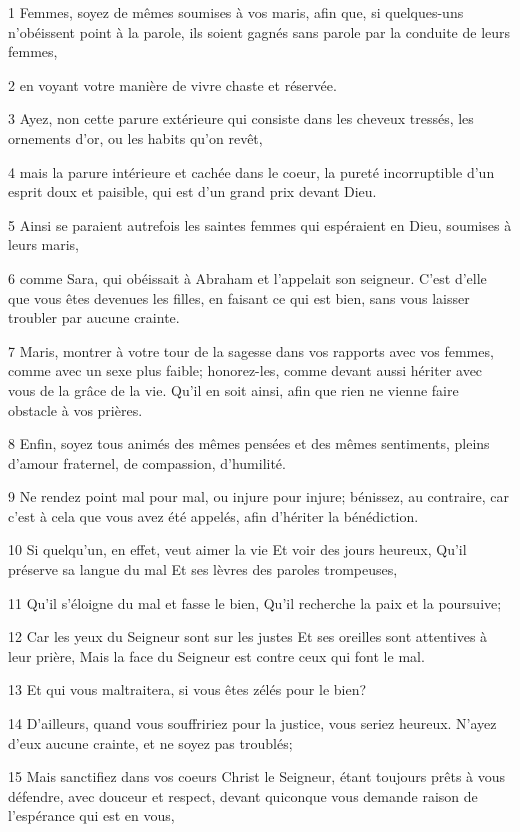 \par 1 Femmes, soyez de mêmes soumises à vos maris, afin que, si quelques-uns n'obéissent point à la parole, ils soient gagnés sans parole par la conduite de leurs femmes,
\par 2 en voyant votre manière de vivre chaste et réservée.
\par 3 Ayez, non cette parure extérieure qui consiste dans les cheveux tressés, les ornements d'or, ou les habits qu'on revêt,
\par 4 mais la parure intérieure et cachée dans le coeur, la pureté incorruptible d'un esprit doux et paisible, qui est d'un grand prix devant Dieu.
\par 5 Ainsi se paraient autrefois les saintes femmes qui espéraient en Dieu, soumises à leurs maris,
\par 6 comme Sara, qui obéissait à Abraham et l'appelait son seigneur. C'est d'elle que vous êtes devenues les filles, en faisant ce qui est bien, sans vous laisser troubler par aucune crainte.
\par 7 Maris, montrer à votre tour de la sagesse dans vos rapports avec vos femmes, comme avec un sexe plus faible; honorez-les, comme devant aussi hériter avec vous de la grâce de la vie. Qu'il en soit ainsi, afin que rien ne vienne faire obstacle à vos prières.
\par 8 Enfin, soyez tous animés des mêmes pensées et des mêmes sentiments, pleins d'amour fraternel, de compassion, d'humilité.
\par 9 Ne rendez point mal pour mal, ou injure pour injure; bénissez, au contraire, car c'est à cela que vous avez été appelés, afin d'hériter la bénédiction.
\par 10 Si quelqu'un, en effet, veut aimer la vie Et voir des jours heureux, Qu'il préserve sa langue du mal Et ses lèvres des paroles trompeuses,
\par 11 Qu'il s'éloigne du mal et fasse le bien, Qu'il recherche la paix et la poursuive;
\par 12 Car les yeux du Seigneur sont sur les justes Et ses oreilles sont attentives à leur prière, Mais la face du Seigneur est contre ceux qui font le mal.
\par 13 Et qui vous maltraitera, si vous êtes zélés pour le bien?
\par 14 D'ailleurs, quand vous souffririez pour la justice, vous seriez heureux. N'ayez d'eux aucune crainte, et ne soyez pas troublés;
\par 15 Mais sanctifiez dans vos coeurs Christ le Seigneur, étant toujours prêts à vous défendre, avec douceur et respect, devant quiconque vous demande raison de l'espérance qui est en vous,
